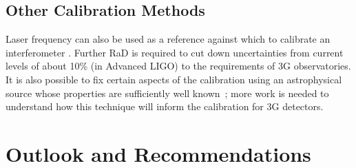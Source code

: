 \subsection{Other Calibration Methods}
Laser frequency can also be used as a reference against which to calibrate an interferometer \cite{Leong2012, PhysRevD.95.062003}. Further \ac{RaD}   is required to cut down uncertainties from current levels of about 10\% (in Advanced LIGO) to the requirements of \ac{3G}   observatories.
It is also possible to fix certain aspects of the calibration using an astrophysical source whose properties are sufficiently well known~\cite{CalibrationGW170817,Pitkin:2015kgm}; more work is needed to understand how this technique will inform the calibration for \ac{3G}   detectors.


\section{Outlook and Recommendations}

